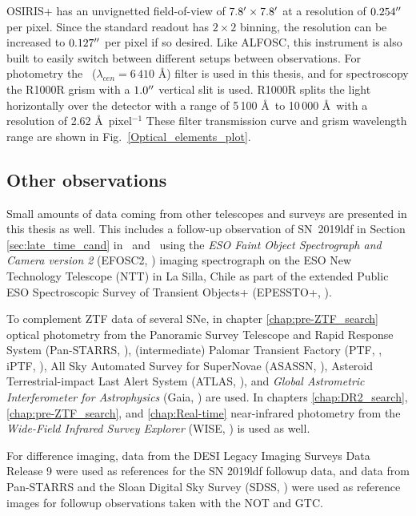 \documentclass[a4paper,oneside,12pt, class=Latex/Classes/PhDthesisPSnPDF, crop=false]{standalone}
\begin{document}
OSIRIS+ has an unvignetted field-of-view of $7.8^{\prime}\times7.8^{\prime}$ at a resolution of $0.254^{\prime\prime}$ per pixel. Since the standard readout has $2\times2$ binning, the resolution can be increased to $0.127^{\prime\prime}$ per pixel if so desired. Like ALFOSC, this instrument is also built to easily switch between different setups between observations. For photometry the \ztfr~($\lambda_{cen} =6\,410$ \AA) filter is used in this thesis, and for spectroscopy the R1000R grism with a $1.0^{\prime\prime}$ vertical slit is used. R1000R splits the light horizontally over the detector with a range of 5\,100 \AA\ to 10\,000 \AA\ with a resolution of 2.62 \AA\ pixel$^{-1}$ These filter transmission curve and grism wavelength range are shown in Fig.~\ref{Optical_elements_plot}.


\subsection{Other observations}
Small amounts of data coming from other telescopes and surveys are presented in this thesis as well. This includes a follow-up observation of SN~2019ldf in Section \ref{sec:late_time_cand} in \ztfg\ and \ztfr\ using the \textit{ESO Faint Object Spectrograph and Camera version 2} (EFOSC2, \citealt{EFOSC2}) imaging spectrograph on the ESO New Technology Telescope (NTT) in La Silla, Chile as part of the extended Public ESO Spectroscopic Survey of Transient Objects+ (EPESSTO+, \citealt{PESSTO}).

To complement ZTF data of several SNe, in chapter \ref{chap:pre-ZTF_search} optical photometry from the Panoramic Survey Telescope and Rapid Response System (Pan-STARRS, \citealt{Pan-STARRS1}), (intermediate) Palomar Transient Factory (PTF, \citealt{PTF_1, PTF_2}, iPTF, \citealt{iPTF}), All Sky Automated Survey for SuperNovae (ASASSN, \citealt{ASASSN_paper1, ASASSN_catalog}), Asteroid Terrestrial-impact Last Alert System (ATLAS, \citealt{ATLAS}),  and \textit{Global Astrometric Interferometer for Astrophysics} (Gaia, \citealt{Gaia}) are used. In chapters \ref{chap:DR2_search}, \ref{chap:pre-ZTF_search}, and \ref{chap:Real-time} near-infrared photometry from the \textit{Wide-Field Infrared Survey Explorer} (WISE, \citealt{WISE}) is used as well.

For difference imaging, data from the DESI Legacy Imaging Surveys Data Release 9 \citep{DESI-Legacy_Imaging_Surveys} were used as references for the SN 2019ldf followup data, and data from Pan-STARRS and the Sloan Digital Sky Survey (SDSS, \citealt{SDSS-I-II, SDSS_DR4, SDSS_telescope, SDSS_Spectograph}) were used as reference images for followup observations taken with the NOT and GTC.
\end{document}
